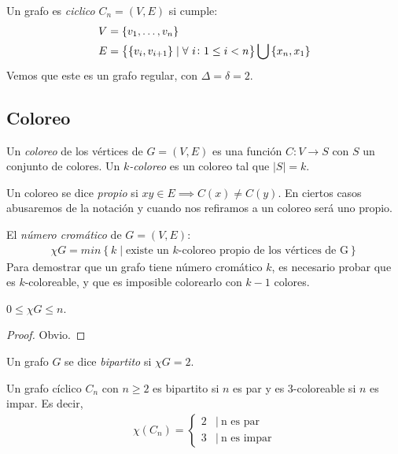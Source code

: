 \begin{definition}
Un grafo es \emph{ciclico} $C_n = (V,E)$ si cumple:
\begin{align}
    V &= \left\{v_1,\mathellipsis,v_n\right\}\\
    E &= \left\{ \left\{v_i,v_{i+1}\right\} \mid \forall~i\colon 1 \le i < n\right\} \bigcup \left\{x_n,x_1\right\}\\
\end{align}
Vemos que este es un grafo regular, con $\Delta = \delta = 2$.
\end{definition}

\subsection{Coloreo}
\begin{definition}
  Un \emph{coloreo} de los vértices de $G = (V,E)$ es una función
  $C \colon V \to S$ con $S$ un conjunto de colores. Un \emph{$k$-coloreo} es
  un coloreo tal que $|S| = k$.
\end{definition}

\begin{definition}
Un coloreo se dice \emph{propio} si $xy \in E \implies C(x) \neq C(y)$. En ciertos casos abusaremos de la notación y cuando nos refiramos a un coloreo será uno propio.
\end{definition}

\begin{definition}
El \emph{número cromático} de $G = (V,E)$:
\begin{align}
    \chi{G} = min\left\{k \mid \text{existe un $k$-coloreo propio de los vértices de G}\right\}
\end{align}
Para demostrar que un grafo tiene número cromático $k$, es necesario probar que es $k$-coloreable, y que es imposible colorearlo con $k-1$ colores.
\end{definition}

\begin{proposition}
$0 \le \chi{G}\le n$.
\end{proposition}
\begin{proof}
Obvio.
\end{proof}

\begin{definition}
Un grafo $G$ se dice \emph{bipartito} si $\chi{G} = 2$.
\end{definition}

\begin{proposition}\label{graph_cyclic_color}
Un grafo cíclico $C_n$ con $n \ge 2$ es bipartito si $n$ es par y es $3$-coloreable si $n$ es impar. Es decir,
\begin{align}
    \chi(C_n) = 
    \begin{cases}
                2 & |\ \text{n es par} \\
                3 & |\ \text{n es impar}
    \end{cases}
\end{align}
\end{proposition}


